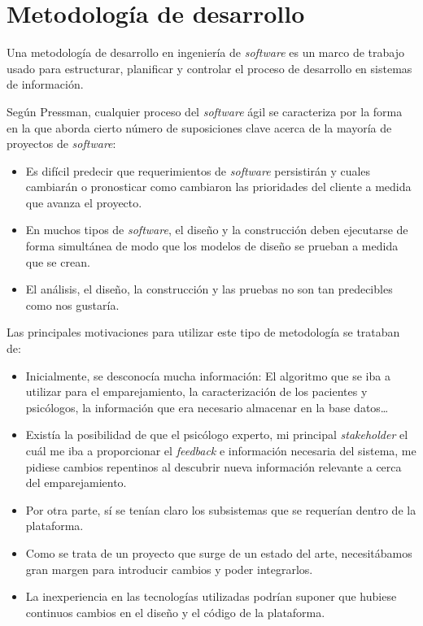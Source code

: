 
\section{Metodología de desarrollo}
Una metodología de desarrollo en ingeniería de \textit{software} es un marco de trabajo usado para estructurar, planificar y controlar el proceso de desarrollo en sistemas de información.


Según Pressman\cite{pressman}, cualquier proceso del \textit{software} ágil se caracteriza por la forma en la que aborda cierto número de suposiciones clave acerca de la mayoría de proyectos de \textit{software}:

\begin{itemize}
\item Es difícil predecir que requerimientos de \textit{software} persistirán y cuales cambiarán o pronosticar como cambiaron las prioridades del cliente a medida que avanza el proyecto.
\item En muchos tipos de \textit{software}, el diseño y la construcción deben ejecutarse de forma simultánea de modo que los modelos de diseño se prueban a medida que se crean.
\item El análisis, el diseño, la construcción y las pruebas no son tan predecibles como nos gustaría.
\end{itemize} 


Las principales motivaciones para utilizar este tipo de metodología se trataban de:

\begin{itemize}
\item Inicialmente, se desconocía mucha información: El algoritmo que se iba a utilizar para el emparejamiento, la caracterización de los pacientes y psicólogos, la información que era necesario almacenar en la base datos\dots
\item Existía la posibilidad de que el psicólogo experto, mi principal \textit{stakeholder} el cuál me iba a proporcionar el \textit{feedback} e información necesaria del sistema, me pidiese cambios repentinos al descubrir nueva información relevante a cerca del emparejamiento.
\item Por otra parte, sí se tenían claro los subsistemas que se requerían dentro de la plataforma.
\item Como se trata de un proyecto que surge de un estado del arte, necesitábamos gran margen para introducir cambios y poder integrarlos.
\item La inexperiencia en las tecnologías utilizadas podrían suponer que hubiese continuos cambios en el diseño y el código de la plataforma.
\end{itemize}


